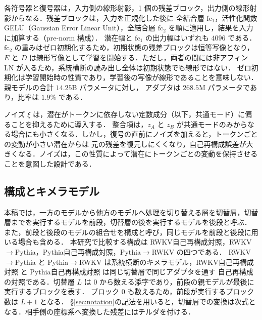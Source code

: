 \documentclass[techrep,noauthor]{ipsj}
\newcommand{\rev}[1]{{\color{blue}#1}}
\newcommand{\revr}[1]{{\color{red}#1}}
\newcommand{\revg}[1]{{\color{green!50!black}#1}}
\newcommand{\revp}[1]{{\color{violet}#1}}
\newcommand{\RWKVself}{\textsf{RWKV自己再構成対照}}
\newcommand{\Pythiaself}{\textsf{Pythia自己再構成対照}}
\newcommand{\RtoP}{\textsf{RWKV$\to$\allowbreak Pythia}}
\newcommand{\PtoR}{\textsf{Pythia$\to$\allowbreak RWKV}}
\begin{document}
\revr{各符号器と復号器は，入力側の線形射影，1 個の残差ブロック，出力側の線形射影からなる．残差ブロックは，入力を正規化した後に
全結合層 $\mathrm{fc}_1$，活性化関数 GELU（Gaussian Error Linear Unit），全結合層 $\mathrm{fc}_2$ を順に適用し，結果を入力に加算する（pre-norm 構成）．
潜在幅と $\mathrm{fc}_1$ の出力幅はいずれも $4096$ である．$\mathrm{fc}_2$ の重みはゼロ初期化するため，初期状態の残差ブロックは恒等写像となり，
$E$ と $D$ は線形写像として学習を開始する．}ただし，両者の間には非アフィン LN が入るため，系統横断の読み出し全体は初期状態でも線形ではない．
ゼロ初期化は学習開始時の性質であり，学習後の写像が線形であることを意味しない．親モデルの合計 $14.25$B パラメータに対し，
アダプタは $268.5$M パラメータであり，比率は $1.9\%$ である．

\revg{ノイズ $\xi$ は，潜在がトークンに依存しない定数成分（以下，共通モード）に偏ることを抑えるために導入する．
整合項は，$z_A$ と $z_B$ が共通モードのみからなる場合にも小さくなる．しかし，復号の直前にノイズを加えると，トークンごとの変動が小さい潜在からは
元の残差を復元しにくくなり，自己再構成誤差が大きくなる．ノイズは，この性質によって潜在にトークンごとの変動を保持させることを意図した設計である．}

\subsection{\revr{構成とキメラモデル}}
\revr{本稿では，一方のモデルから他方のモデルへ処理を切り替える層を切替層，切替層までを実行するモデルを前段，切替層の後を実行するモデルを後段と呼ぶ．
また，前段と後段のモデルの組合せを構成と呼び，同じモデルを前段と後段に用いる場合も含める．}
本研究で比較する構成は \RWKVself{}，\RtoP{}，\Pythiaself{}，\PtoR{} の四つである．
\RtoP{} と \PtoR{} は系統横断のキメラモデル，\RWKVself{} と \Pythiaself{} は同じ切替層で同じアダプタを通す
\rev{自己再構成}の対照である．切替層 $L$ は $0$ から数える添字であり，前段の親モデルが最後に実行するブロックを表す．
ブロック $0$ も数えるため，前段が実行するブロック数は $L{+}1$ となる．
\revr{\S\revp{\ref{sec:notation}}の記法を用いると，切替層での変換は次式となる．相手側の座標系へ変換した残差にはチルダを付ける．}
\end{document}
